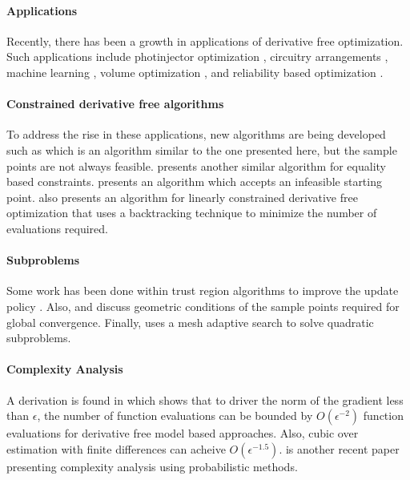 \documentclass{article}
\theoremstyle{case}
\begin{document}
\paragraph{Applications}
Recently, there has been a growth in applications of derivative free optimization.
Such applications include photinjector optimization \cite{1742-6596-874-1-012062}, circuitry arrangements \cite{PLOSKAS201816}, machine learning \cite{KS2018}, volume optimization \cite{Cheng2017}, and reliability based optimization \cite{Gao2017}.

\paragraph{Constrained derivative free algorithms}
To address the rise in these applications, new algorithms are being developed such as \cite{doi:10.1080/10556788.2015.1026968} which is an algorithm similar to the one presented here, but the sample points are not always feasible.
\cite{Tröltzsch2016} presents another similar algorithm for equality based constraints.
\cite{infeasiblestarting} presents an algorithm which accepts an infeasible starting point.
\cite{Gao2018} also presents an algorithm for linearly constrained derivative free optimization that uses a backtracking technique to minimize the number of evaluations required.

\paragraph{Subproblems}
Some work has been done within trust region algorithms to improve the update policy \cite{Kamandi2017}.
Also, \cite{Verdério2017} and \cite{doi:10.1080/10556780802409296} discuss geometric conditions of the sample points required for global convergence.
Finally, \cite{AMAIOUA201813} uses a mesh adaptive search to solve quadratic subproblems.


\paragraph{Complexity Analysis}

A derivation is found in \cite{doi:10.1137/151005683} which shows that to driver the norm of the gradient less than $\epsilon$, the number of function evaluations can be bounded by $O(\epsilon^{-2})$ 
function evaluations for derivative free model based approaches. Also, cubic over estimation with finite differences can acheive $O(\epsilon^{-1.5})$. \cite{doi:10.1093/imanum/drx043} is another recent paper presenting complexity analysis using probabilistic methods.
\end{document}
